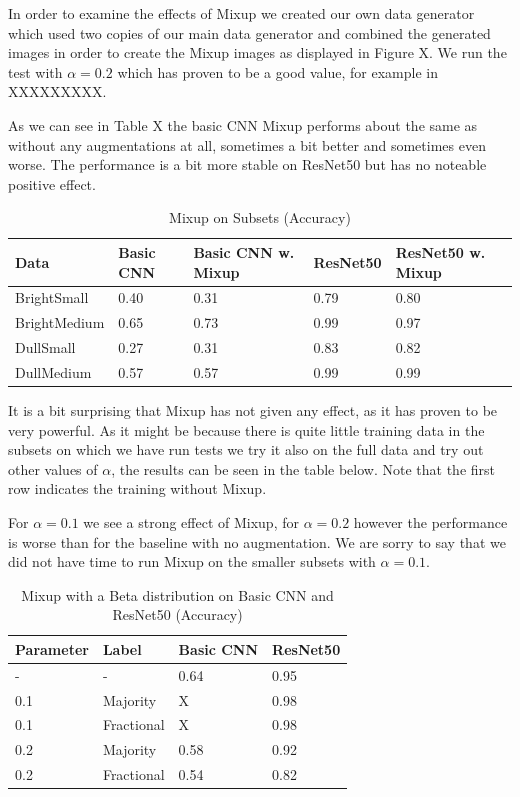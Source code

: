 \documentclass{article}
\begin{document}
In order to examine the effects of Mixup we created our own data generator which used two copies of our main data generator and combined the generated images in order to create the Mixup images as displayed in Figure X. We run the test with $\alpha=0.2$ which has proven to be a good value, for example in XXXXXXXXX.

As we can see in Table X the basic CNN Mixup performs about the same as without any augmentations at all, sometimes a bit better and sometimes even worse. The performance is a bit more stable on ResNet50 but has no noteable positive effect.

\begin{table}[H]
	\caption{Mixup on Subsets (Accuracy)}
	\label{sample-table}
	\centering
	\begin{tabular}{lllll}
		\toprule
		Data &  Basic CNN & Basic CNN w. Mixup & ResNet50 & ResNet50 w. Mixup \\
		\midrule
		BrightSmall  & 0.40 & 0.31 & 0.79 &  0.80 \\
		BrightMedium & 0.65 & 0.73 & 0.99 &  0.97 \\
		DullSmall    & 0.27 & 0.31 & 0.83 &  0.82 \\
		DullMedium   & 0.57 & 0.57 & 0.99 &  0.99 \\
		\bottomrule
	\end{tabular}
\end{table}

It is a bit surprising that Mixup has not given any effect, as it has proven to be very powerful. As it might be because there is quite little training data in the subsets on which we have run tests we try it also on the full data and try out other values of $\alpha$, the results can be seen in the table below. Note that the first row indicates the training without Mixup.

For $\alpha=0.1$ we see a strong effect of Mixup, for $\alpha=0.2$ however the performance is worse than for the baseline with no augmentation. We are sorry to say that we did not have time to run Mixup on the smaller subsets with $\alpha=0.1$. 

\begin{table}[H]
	\caption{Mixup with a Beta distribution on Basic CNN and ResNet50 (Accuracy)}
	\label{sample-table}
	\centering
	\begin{tabular}{llll}
		\toprule
		Parameter & Label & Basic CNN & ResNet50 \\
		\midrule
		-   & -        & 0.64   & 0.95 \\
		0.1 & Majority & X       & 0.98 \\
		0.1 & Fractional & X     & 0.98  \\ 
		0.2 & Majority & 0.58   & 0.92 \\
		0.2 & Fractional & 0.54 & 0.82 \\ 
		
		\bottomrule
	\end{tabular}
\end{table}
\end{document}
